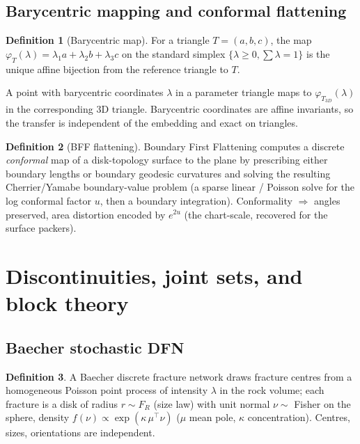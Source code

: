 \documentclass[11pt]{article}
\theoremstyle{definition}\newtheorem{definition}{Definition}[section]
\theoremstyle{plain}\newtheorem{theorem}{Theorem}[section]
\begin{document}
\subsection{Barycentric mapping and conformal flattening}
\begin{definition}[Barycentric map]
For a triangle $T=(a,b,c)$, the map $\varphi_T(\lambda)=\lambda_1 a+\lambda_2 b+\lambda_3 c$ on the standard
simplex $\{\lambda\ge0,\sum\lambda=1\}$ is the unique affine bijection from the reference triangle to $T$.
\end{definition}
\begin{proposition}[2D$\to$3D transfer]
A point with barycentric coordinates $\lambda$ in a parameter triangle maps to $\varphi_{T_{3D}}(\lambda)$ in
the corresponding 3D triangle. Barycentric coordinates are affine invariants, so the transfer is independent
of the embedding and exact on triangles.
\end{proposition}
\begin{definition}[BFF flattening]
Boundary First Flattening computes a discrete \emph{conformal} map of a disk-topology surface to the plane by
prescribing either boundary lengths or boundary geodesic curvatures and solving the resulting Cherrier/Yamabe
boundary-value problem (a sparse linear / Poisson solve for the log conformal factor $u$, then a boundary
integration). Conformality $\Rightarrow$ angles preserved, area distortion encoded by $e^{2u}$ (the
chart-scale, recovered for the surface packers).
\end{definition}

\section{Discontinuities, joint sets, and block theory}
\subsection{Baecher stochastic DFN}
\begin{definition}
A Baecher discrete fracture network draws fracture centres from a homogeneous Poisson point process of
intensity $\lambda$ in the rock volume; each fracture is a disk of radius $r\sim F_R$ (size law) with unit
normal $\nu\sim$ Fisher on the sphere, density $f(\nu)\propto\exp(\kappa\,\mu^\top\nu)$ ($\mu$ mean pole,
$\kappa$ concentration). Centres, sizes, orientations are independent.
\end{definition}
\end{document}
